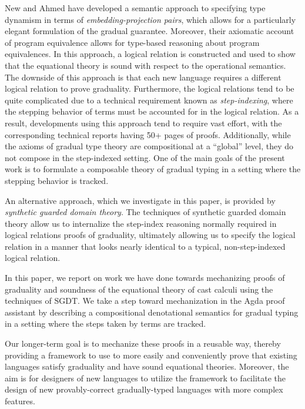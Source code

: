 New and Ahmed \cite{new-ahmed2018}
have developed a semantic approach to specifying type dynamism in terms of
\emph{embedding-projection pairs}, which allows for a particularly elegant formulation of the
gradual guarantee.
Moreover, their axiomatic account of program equivalence allows for type-based reasoning
about program equivalences.
%
In this approach, a logical relation is constructed and used to show that the equational theory
is sound with respect to the operational semantics.
The downside of this approach is that each new language requires a different logical relation
to prove graduality. Furthermore, the logical relations tend to be quite complicated due
to a technical requirement known as \emph{step-indexing}, where the stepping behavior of terms
must be accounted for in the logical relation.
As a result, developments using this approach tend to require vast effort, with the
corresponding technical reports having 50+ pages of proofs.
%
Additionally, while the axioms of gradual type theory are compositional at a ``global'' level,
they do not compose in the step-indexed setting. One of the main goals of the present work
is to formulate a composable theory of gradual typing in a setting where the stepping behavior
is tracked.

An alternative approach, which we investigate in this paper, is provided by
\emph{synthetic guarded domain theory}.
The techniques of synthetic guarded domain theory allow us to internalize the
step-index reasoning normally required in logical relations proofs of graduality,
ultimately allowing us to specify the logical relation in a manner that looks nearly
identical to a typical, non-step-indexed logical relation.

In this paper, we report on work we have done towards mechanizing proofs of graduality
and soundness of the equational theory of cast calculi using the techniques of SGDT.
We take a step toward mechanization in the Agda proof assistant by describing a compositional
denotational semantics for gradual typing in a setting where the steps taken by terms are tracked.

Our longer-term goal is to mechanize these proofs in a reusable way,
thereby providing a framework to use to more easily and
conveniently prove that existing languages satisfy graduality and have
sound equational theories. Moreover, the aim is for designers of new languages
to utilize the framework to facilitate the design of new provably-correct
gradually-typed languages with more complex features.


